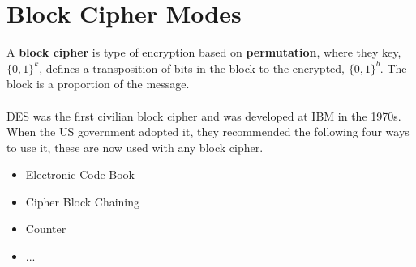 
\section{Block Cipher Modes}\label{sec:blockciphermodes}
    A \textbf{block cipher} is type of encryption based on \textbf{permutation}, where they key, $\{0,1\}^k$, defines a transposition of bits in the block to the encrypted, $\{0,1\}^b$. The block is a proportion of the message.\\
    \\
    DES was the first civilian block cipher and was developed at IBM in the 1970s. When the US government adopted it, they recommended the following four ways to use it, these are now used with any block cipher.
    \begin{itemize}
        \item Electronic Code Book
        \item Cipher Block Chaining
        \item Counter
        \item ...
    \end{itemize}
    
